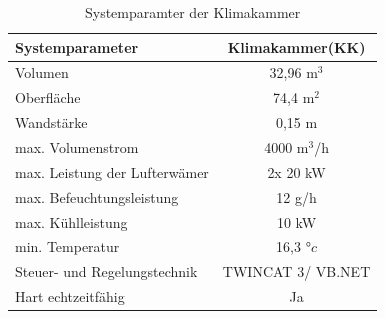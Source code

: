 \begin{table}[htb]
\centering
\caption{Systemparamter der Klimakammer \citep{Nuerenberg2015}}\vspace{6pt}
\label{tab:Parameter KK}
\begin{tabular}{lc}
\hline 
\textbf{Systemparameter} & \textbf{Klimakammer(KK)} \\ 
\hline 
\hline
Volumen & 32,96 m$^3$ \\ 
\hline 
Oberfläche & 74,4 m$^2$ \\ 
\hline 
Wandstärke & 0,15 m \\ 
\hline 
max. Volumenstrom & 4000 m$^3$/h \\ 
\hline 
max. Leistung der Lufterwämer & 2x 20 kW \\ 
\hline 
max. Befeuchtungsleistung & 12 g/h \\ 
\hline 
max. Kühlleistung & 10 kW \\ 
\hline 
min. Temperatur & 16,3 $°c$ \\ 
\hline 
Steuer- und Regelungstechnik & TWINCAT 3/ VB.NET \\ 
\hline 
Hart echtzeitfähig & Ja \\ 
\hline 
\hline
\end{tabular} 
\label{tab:Systemparameter-KK}
\end{table}